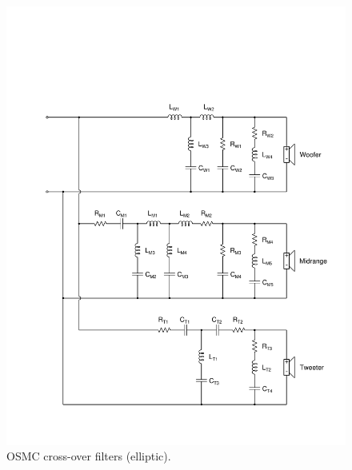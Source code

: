\documentclass[12pt,a4paper]{article}
\providecommand{\figlabel}[1]{\label{fig:#1}}
\begin{document}
\begin{figure}[p]
	\centering
	\includegraphics[width=\textwidth]{OSMC_EL_xover_schem.pdf}
	\caption{OSMC cross-over filters (elliptic).}
	\figlabel{OSMC_EL_xover_schem}
\end{figure}
\end{document}
